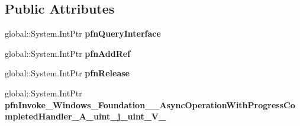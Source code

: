 \subsection*{Public Attributes}
\begin{DoxyCompactItemize}
\item 
\mbox{\label{struct_windows_1_1_foundation_1_1_async_operation_with_progress_completed_handler___a__uint__j__uint___v_______impl_1_1_vtbl_a3fd2e4c412db3602247d536a16189000}} 
global\+::\+System.\+Int\+Ptr {\bfseries pfn\+Query\+Interface}
\item 
\mbox{\label{struct_windows_1_1_foundation_1_1_async_operation_with_progress_completed_handler___a__uint__j__uint___v_______impl_1_1_vtbl_a2ea650f3a87dea4051dd6b6a284e83eb}} 
global\+::\+System.\+Int\+Ptr {\bfseries pfn\+Add\+Ref}
\item 
\mbox{\label{struct_windows_1_1_foundation_1_1_async_operation_with_progress_completed_handler___a__uint__j__uint___v_______impl_1_1_vtbl_abc644f7a3e0aa3e8635c3a28a251bcc6}} 
global\+::\+System.\+Int\+Ptr {\bfseries pfn\+Release}
\item 
\mbox{\label{struct_windows_1_1_foundation_1_1_async_operation_with_progress_completed_handler___a__uint__j__uint___v_______impl_1_1_vtbl_a80358b03d0a020198b80c6e2ec20a820}} 
global\+::\+System.\+Int\+Ptr {\bfseries pfn\+Invoke\+\_\+\+Windows\+\_\+\+Foundation\+\_\+\+\_\+\+Async\+Operation\+With\+Progress\+Completed\+Handler\+\_\+\+A\+\_\+uint\+\_\+j\+\_\+uint\+\_\+\+V\+\_\+}
\end{DoxyCompactItemize}
